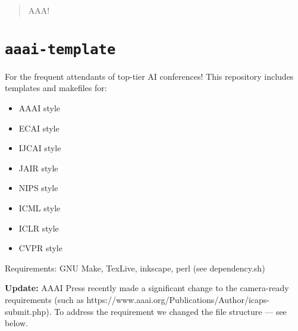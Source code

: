 % 
% 
% 
% 
% 
% 
\begin{abstract}
AAA!
\end{abstract}

\section{\texttt{aaai-template}}\label{aaai-template}

For the frequent attendants of top-tier AI conferences!
This repository includes templates and makefiles for:

\begin{itemize}

\item
  AAAI style
\item
  ECAI style
\item
  IJCAI style
\item
  JAIR style
\item
  NIPS style
\item
  ICML style
\item
  ICLR style
\item
  CVPR style
\end{itemize}

Requirements: GNU Make, TexLive, inkscape, perl (see dependency.sh)

\textbf{Update:} AAAI Press recently made a significant change to the
camera-ready requirements (such as
https://www.aaai.org/Publications/Author/icaps-submit.php). To address
the requirement we changed the file structure --- see below.


